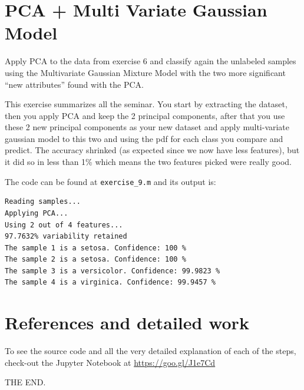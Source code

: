 \documentclass[]{article}
\begin{document}
\pagebreak

\section{PCA + Multi Variate Gaussian Model}

Apply PCA to the data from exercise 6 and classify again the unlabeled samples using the Multivariate Gaussian Mixture Model with the two more significant “new attributes” found with the PCA.

This exercise summarizes all the seminar. You start by extracting the dataset, then you apply PCA and keep the 2 principal components, after that you use these 2 new principal components as your new dataset and apply multi-variate gaussian model to this two and using the pdf for each class you compare and predict. The accuracy shrinked (as expected since we now have less features), but it did so in less than 1\% which means the two features picked were really good.

The code can be found at \texttt{exercise\_9.m} and its output is:

\begin{verbatim}
Reading samples...
Applying PCA...
Using 2 out of 4 features...
97.7632% variability retained
The sample 1 is a setosa. Confidence: 100 %
The sample 2 is a setosa. Confidence: 100 %
The sample 3 is a versicolor. Confidence: 99.9823 %
The sample 4 is a virginica. Confidence: 99.9457 %
\end{verbatim}

\section{References and detailed work}

To see the source code and all the very detailed explanation of each of the steps, check-out the Jupyter Notebook at \url{https://goo.gl/J1e7Cd}\\

\centering

\textsc{THE END.}
\end{document}
